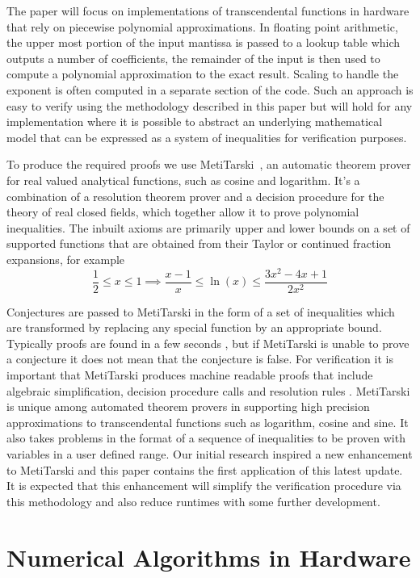 \documentclass[a4]{article}
\begin{document}
The paper will focus on implementations of transcendental functions in hardware that rely on piecewise polynomial approximations. In floating point arithmetic, the upper most portion of the input mantissa is passed to a lookup table which outputs a number of coefficients, the remainder of the input is then used to compute a polynomial approximation to the exact result. Scaling to handle the exponent is often computed in a separate section of the code. Such an approach is easy to verify using the methodology described in this paper but will hold for any implementation where it is possible to abstract an underlying mathematical model that can be expressed as a system of inequalities for verification purposes.

To produce the required proofs we use MetiTarski~\cite{akbarpour2010metitarski}, an automatic theorem prover for real valued analytical functions, such as cosine and logarithm. It's a combination of a resolution theorem prover and a decision procedure for the theory of real closed fields, which together allow it to prove polynomial inequalities. The inbuilt axioms are primarily upper and lower bounds on a set of supported functions that are obtained from their Taylor or continued fraction expansions, for example
$$\frac{1}{2} \leq x \leq 1 \implies \frac{x-1}{x} \leq \ln(x) \leq \frac{3x^2-4x+1}{2x^2}$$

Conjectures are passed to MetiTarski in the form of a set of inequalities which are transformed by replacing any special function by an appropriate bound. Typically proofs are found in a few seconds \cite{akbarpour2009applications}, but if MetiTarski is unable to prove a conjecture it does not mean that the conjecture is false. For verification it is important that MetiTarski produces machine readable proofs that include algebraic simplification, decision procedure calls and resolution rules \cite{denman2009formal}. MetiTarski is unique among automated theorem provers in supporting high precision approximations to transcendental functions such as logarithm, cosine and sine. It also takes problems in the format of a sequence of inequalities to be proven with variables in a user defined range. Our initial research inspired a new enhancement to MetiTarski and this paper contains the first application of this latest update. It is expected that this enhancement will simplify the verification procedure via this methodology and also reduce runtimes with some further development. 



\section{Numerical Algorithms in Hardware}
\end{document}
